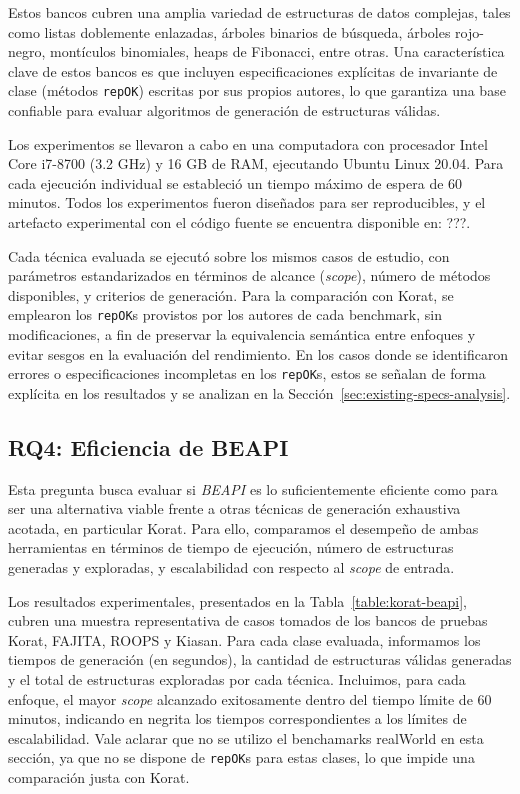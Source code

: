 Estos bancos cubren una amplia variedad de estructuras de datos complejas, tales como listas doblemente enlazadas, árboles binarios de búsqueda, 
árboles rojo-negro, montículos binomiales, heaps de Fibonacci, entre otras. Una característica clave 
de estos bancos es que incluyen especificaciones explícitas de invariante de clase (métodos 
\texttt{repOK}) escritas por sus propios autores, lo que garantiza una base confiable para evaluar 
algoritmos de generación de estructuras válidas.

Los experimentos se llevaron a cabo en una computadora con procesador Intel Core i7-8700 
(3.2 GHz) y 16 GB de RAM, ejecutando Ubuntu Linux 20.04. Para cada ejecución individual se estableció 
un tiempo máximo de espera de 60 minutos. Todos los experimentos fueron diseñados para ser reproducibles, 
y el artefacto experimental con el código fuente se encuentra disponible en: ???.

Cada técnica evaluada se ejecutó sobre los mismos casos de estudio, con parámetros estandarizados 
en términos de alcance (\textit{scope}), número de métodos disponibles, y criterios de generación. 
Para la comparación con \textsf{Korat}, se emplearon los \texttt{repOK}s provistos por los autores 
de cada benchmark, sin modificaciones, a fin de preservar la equivalencia semántica entre enfoques 
y evitar sesgos en la evaluación del rendimiento. En los casos donde se identificaron errores o 
especificaciones incompletas en los \texttt{repOK}s, estos se señalan de forma explícita en los 
resultados y se analizan en la Sección~\ref{sec:existing-specs-analysis}.



\subsection{RQ4: Eficiencia de BEAPI}

Esta pregunta busca evaluar si \emph{BEAPI} es lo suficientemente eficiente como para ser una 
alternativa viable frente a otras técnicas de generación exhaustiva acotada, en particular 
\textsf{Korat}. Para ello, comparamos el desempeño de ambas herramientas en términos de tiempo 
de ejecución, número de estructuras generadas y exploradas, y escalabilidad con respecto al 
\emph{scope} de entrada.

Los resultados experimentales, presentados en la Tabla~\ref{table:korat-beapi}, cubren una muestra 
representativa de casos tomados de los bancos de pruebas \textsf{Korat}, \textsf{FAJITA}, 
\textsf{ROOPS} y \textsf{Kiasan}. Para cada clase evaluada, informamos los tiempos de generación 
(en segundos), la cantidad de estructuras válidas generadas y el total de estructuras exploradas 
por cada técnica. Incluimos, para cada enfoque, el mayor \emph{scope} alcanzado exitosamente dentro 
del tiempo límite de 60 minutos, indicando en negrita los tiempos correspondientes a los límites 
de escalabilidad. Vale aclarar que no se utilizo el benchamarks \textsf{realWorld} en esta sección, ya que
no se dispone de \texttt{repOK}s para estas clases, lo que impide una comparación justa con \textsf{Korat}.

